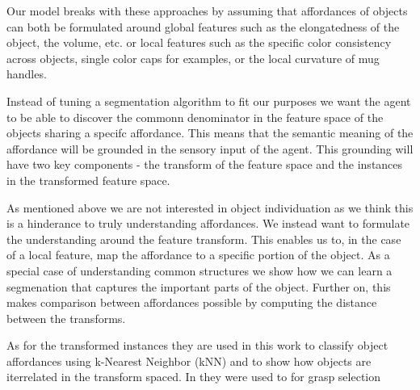 Our model breaks with these approaches by assuming that affordances of
objects can both be formulated around global features such as the
elongatedness of the object, the volume, etc. or local features such as
the specific color consistency across objects, single color caps for
examples, or the local curvature of mug handles.

Instead of tuning a segmentation algorithm to fit our purposes we want
the agent to be able to discover the commonn denominator in the feature
space of the objects sharing a specifc affordance. This means that the
semantic meaning of the affordance will be grounded in the sensory input
of the agent. This grounding will have two key components - the
transform of the feature space and the instances in the transformed
feature space.

As mentioned above we are not interested in object individuation as we
think this is a hinderance to truly understanding affordances. We
instead want to formulate the understanding around the feature
transform. This enables us to, in the case of a local feature, map the
affordance to a specific portion of the object. As a special case of
understanding common structures we show how we can learn a segmenation
that captures the important parts of the object. Further on, this makes
comparison between affordances possible by computing the distance
between the transforms.

As for the transformed instances they are used in this work to classify
object affordances using k-Nearest Neighbor (kNN) and to show how
objects are iterrelated in the transform spaced. In \cite{Hjelm:2015hw}
they were used to for grasp selection

\cite{Nikandrova:2015uu} \cite{Thomaz:2009uk} \cite{Griffith:2009cm}
\cite{Stark:2008bx}

